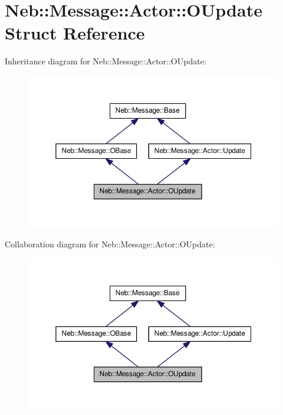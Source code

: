 \hypertarget{structNeb_1_1Message_1_1Actor_1_1OUpdate}{\section{\-Neb\-:\-:\-Message\-:\-:\-Actor\-:\-:\-O\-Update \-Struct \-Reference}
\label{structNeb_1_1Message_1_1Actor_1_1OUpdate}
}


\-Inheritance diagram for \-Neb\-:\-:\-Message\-:\-:\-Actor\-:\-:\-O\-Update\-:\nopagebreak
\begin{figure}[H]
\begin{center}
\leavevmode
\includegraphics[width=350pt]{structNeb_1_1Message_1_1Actor_1_1OUpdate__inherit__graph}
\end{center}
\end{figure}


\-Collaboration diagram for \-Neb\-:\-:\-Message\-:\-:\-Actor\-:\-:\-O\-Update\-:\nopagebreak
\begin{figure}[H]
\begin{center}
\leavevmode
\includegraphics[width=350pt]{structNeb_1_1Message_1_1Actor_1_1OUpdate__coll__graph}
\end{center}
\end{figure}
